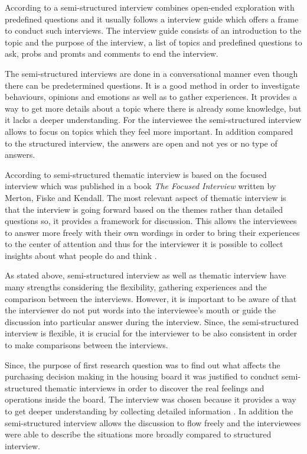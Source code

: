 According to \textcite{Wilson:2013} a semi-structured interview combines open-ended exploration with predefined questions and it usually follows a interview guide which offers a frame to conduct such interviews. The interview guide consists of an introduction to the topic and the purpose of the interview, a list of topics and predefined questions to ask, probs and promts and comments to end the interview.

The semi-structured interviews are done in a conversational manner even though there can be predetermined questions. It is a good method in order to investigate behaviours, opinions and emotions as well as to gather experiences. It provides a way to get more details about a topic where there is already some knowledge, but it lacks a deeper understanding. For the interviewee the semi-structured interview allows to focus on topics which they feel more important. In addition compared to the structured interview, the answers are open and not yes or no type of answers. \parencite{Cliffod:2010,Wilson:2013}

According to \textcite{HH:2001} semi-structured thematic interview is based on the focused interview which was published in a book \emph{The Focused Interview} written by Merton, Fiske and Kendall. The most relevant aspect of thematic interview is that the interview is going forward based on the themes rather than detailed questions so, it provides a framework for discussion. This allows the interviewees to answer more freely with their own wordings in order to bring their experiences to the center of attention and thus for the interviewer it is possible to collect insights about what people do and think \parencite{Cliffod:2010}.

As stated above, semi-structured interview as well as thematic interview have many strengths considering the flexibility, gathering experiences and the comparison between the interviews. However, it is important to be aware of that the interviewer do not put words into the interviewee's mouth or guide the discussion into particular answer during the interview. Since, the semi-structured interview is flexible, it is crucial for the interviewer to be also consistent in order to make comparisons between the interviews. \parencite{Wilson:2013}

Since, the purpose of first research question was to find out what affects the purchasing decision making in the housing board it was justified to conduct semi-structured thematic interviews in order to discover the real feelings and operations inside the board. The interview was chosen because it provides a way to get deeper understanding by collecting detailed information \parencite{Johannesson:2014}. In addition the semi-structured interview allows the discussion to flow freely and the interviewees were able to describe the situations more broadly compared to structured interview.

